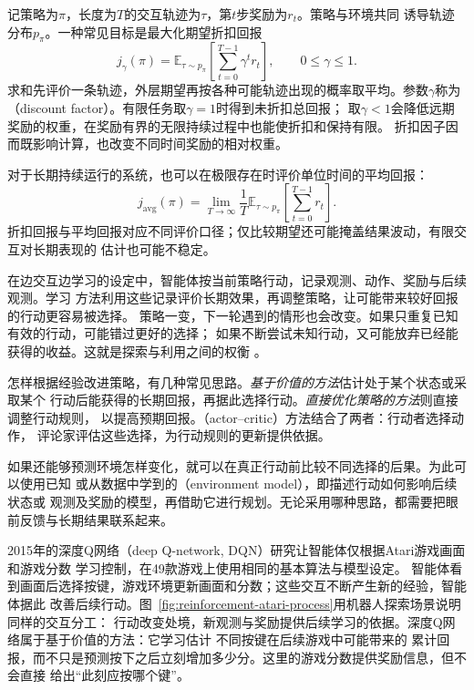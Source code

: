 记策略为$\pi$，长度为$T$的交互轨迹为$\tau$，第$t$步奖励为$r_t$。策略与环境共同
诱导轨迹分布$p_\pi$。一种常见目标是最大化期望折扣回报
\begin{equation}
  j_{\gamma}(\pi)
  =\mathbb{E}_{\tau\sim p_\pi}
    \left[\sum_{t=0}^{T-1}\gamma^t r_t\right],
  \qquad 0\leq\gamma\leq1.
  \label{eq:paradigms-expected-return}
\end{equation}
求和先评价一条轨迹，外层期望再按各种可能轨迹出现的概率取平均。参数$\gamma$称为
（discount factor）。有限任务取$\gamma=1$时得到未折扣总回报；
取$\gamma<1$会降低远期奖励的权重，在奖励有界的无限持续过程中也能使折扣和保持有限。
折扣因子因而既影响计算，也改变不同时间奖励的相对权重。

对于长期持续运行的系统，也可以在极限存在时评价单位时间的平均回报：
\begin{equation}
  j_{\mathrm{avg}}(\pi)
  =\lim_{T\to\infty}\frac1T
    \mathbb{E}_{\tau\sim p_\pi}
    \left[\sum_{t=0}^{T-1}r_t\right].
  \label{eq:paradigms-average-return}
\end{equation}
折扣回报与平均回报对应不同评价口径；仅比较期望还可能掩盖结果波动，有限交互对长期表现的
估计也可能不稳定。

在边交互边学习的设定中，智能体按当前策略行动，记录观测、动作、奖励与后续观测。学习
方法利用这些记录评价长期效果，再调整策略，让可能带来较好回报的行动更容易被选择。
策略一变，下一轮遇到的情形也会改变。如果只重复已知有效的行动，可能错过更好的选择；
如果不断尝试未知行动，又可能放弃已经能获得的收益。这就是探索与利用之间的权衡
。

怎样根据经验改进策略，有几种常见思路。\emph{基于价值的方法}估计处于某个状态或采取某个
行动后能获得的长期回报，再据此选择行动。\emph{直接优化策略的方法}则直接调整行动规则，
以提高预期回报。（actor--critic）方法结合了两者：行动者选择动作，
评论家评估这些选择，为行动规则的更新提供依据。

如果还能够预测环境怎样变化，就可以在真正行动前比较不同选择的后果。为此可以使用已知
或从数据中学到的（environment model），即描述行动如何影响后续状态或
观测及奖励的模型，再借助它进行规划。无论采用哪种思路，都需要把眼前反馈与长期结果联系起来。

2015年的深度Q网络（deep Q-network, DQN）研究让智能体仅根据Atari游戏画面和游戏分数
学习控制，在49款游戏上使用相同的基本算法与模型设定。
智能体看到画面后选择按键，游戏环境更新画面和分数；这些交互不断产生新的经验，智能体据此
改善后续行动。图~\ref{fig:reinforcement-atari-process}用机器人探索场景说明同样的交互分工：
行动改变处境，新观测与奖励提供后续学习的依据。深度Q网络属于基于价值的方法：它学习估计
不同按键在后续游戏中可能带来的
累计回报，而不只是预测按下之后立刻增加多少分。这里的游戏分数提供奖励信息，但不会直接
给出“此刻应按哪个键”。

